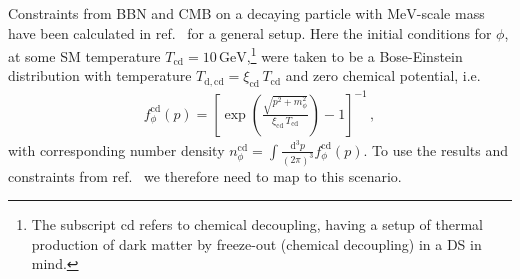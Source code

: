 	Constraints from \ac{BBN} and \ac{CMB} on a decaying particle with $\mathrm{MeV}$-scale mass have been calculated in ref.~\cite{Depta:2020zbh} for a general setup.  Here the initial conditions for $\phi$, at some SM temperature  $T_\mathrm{cd} = 10 \, \mathrm{GeV}$,\footnote{The subscript $\mathrm{cd}$ refers to chemical decoupling, having a setup of thermal production of dark matter by freeze-out (chemical decoupling) in a \ac{DS} in mind.} were taken to be a Bose-Einstein distribution with temperature $T_\mathrm{d, cd}= \xi_\mathrm{cd} \, T_\mathrm{cd}$ and zero chemical potential, i.e.
	\begin{align}
		f_\phi^\mathrm{cd} (p) = \left[\exp \left(\frac{\sqrt{p^2 + m_\phi^2}}{\xi_\mathrm{cd} \, T_\mathrm{cd}}\right) -1\right]^{-1} \,, \label{eq:cosmo_decds_f_cd}
	\end{align}
	with corresponding number density $n_\phi^\mathrm{cd} = \int \frac{\mathrm{d}^3 p}{(2 \pi)^3} f_\phi^\mathrm{cd} (p)$. To use the results and constraints from ref.~\cite{Depta:2020zbh} we therefore need to map to this scenario.
	

